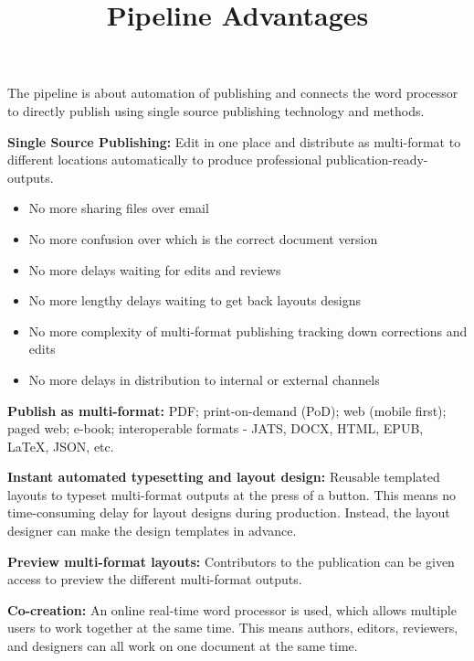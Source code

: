 \documentclass{article}
\begin{document}
\title{Pipeline Advantages}

\maketitle


The pipeline is about automation of publishing and connects the word processor to directly publish using single source publishing technology and methods.


\textbf{Single Source Publishing:} Edit in one place and distribute as multi-format to different locations automatically to produce professional publication-ready-outputs.

\begin{itemize}
\item No more sharing files over email


\item No more confusion over which is the correct document version


\item No more delays waiting for edits and reviews


\item No more lengthy delays waiting to get back layouts designs


\item No more complexity of multi-format publishing tracking down corrections and edits


\item No more delays in distribution to internal or external channels


\end{itemize}

\textbf{Publish as multi-format:} PDF; print-on-demand (PoD); web (mobile first); paged web; e-book; interoperable formats - JATS, DOCX, HTML, EPUB, LaTeX, JSON, etc.


\textbf{Instant automated typesetting and layout design:} Reusable templated layouts to typeset multi-format outputs at the press of a button. This means no time-consuming delay for layout designs during production. Instead, the layout designer can make the design templates in advance.


\textbf{Preview multi-format layouts:} Contributors to the publication can be given access to preview the different multi-format outputs.


\textbf{Co-creation:} An online real-time word processor is used, which allows multiple users to work together at the same time. This means authors, editors, reviewers, and designers can all work on one document at the same time.
\end{document}
